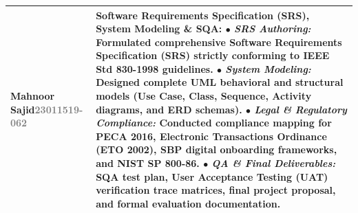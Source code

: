 \documentclass[12pt,a4paper]{article}
\begin{document}
\begin{table}[h]
\begin{tabularx}{\textwidth}{p{3.5cm}X}
\midrule
\textbf{Mahnoor Sajid}\newline \textcolor{gray}{23011519-062} & 
\textbf{Software Requirements Specification (SRS), System Modeling \& SQA:}\newline
$\bullet$ \textit{SRS Authoring:} Formulated comprehensive Software Requirements Specification (SRS) strictly conforming to IEEE Std 830-1998 guidelines.\newline
$\bullet$ \textit{System Modeling:} Designed complete UML behavioral and structural models (Use Case, Class, Sequence, Activity diagrams, and ERD schemas).\newline
$\bullet$ \textit{Legal \& Regulatory Compliance:} Conducted compliance mapping for PECA 2016, Electronic Transactions Ordinance (ETO 2002), SBP digital onboarding frameworks, and NIST SP 800-86.\newline
$\bullet$ \textit{QA \& Final Deliverables:} SQA test plan, User Acceptance Testing (UAT) verification trace matrices, final project proposal, and formal evaluation documentation. \\
\bottomrule
\end{tabularx}
\end{table}
\end{document}
